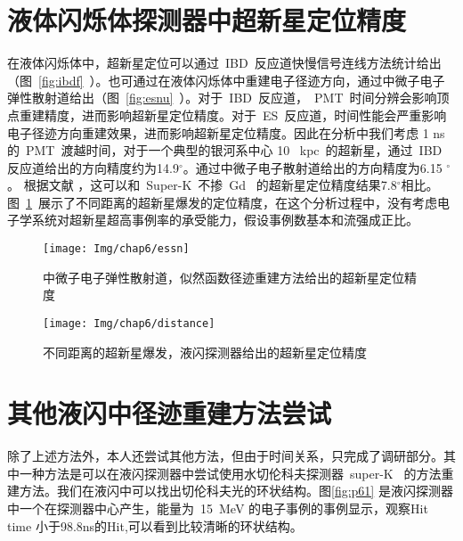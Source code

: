 \section{液体闪烁体探测器中超新星定位精度}
在液体闪烁体中，超新星定位可以通过~IBD~反应道快慢信号连线方法统计给出（图~\ref{fig:ibdf}~）。也可通过在液体闪烁体中重建电子径迹方向，通过中微子电子弹性散射道给出（图~\ref{fig:esnu}~）。对于~IBD~反应道，~PMT~时间分辨会影响顶点重建精度，进而影响超新星定位精度。对于~ES~反应道，时间性能会严重影响电子径迹方向重建效果，进而影响超新星定位精度。因此在分析中我们考虑 1 ns的~PMT~渡越时间，对于一个典型的银河系中心 10 ~kpc~的超新星，通过~IBD~ 反应道给出的方向精度约为14.9$^{\circ}$。通过中微子电子散射道给出的方向精度为6.15 $^{\circ}$。 根据文献 \citep{tomas2003supernova}，这可以和~Super-K~不掺~Gd~ 的超新星定位精度结果7.8$^{\circ}$相比。图~\ref{fig:distance}~展示了不同距离的超新星爆发的定位精度，在这个分析过程中，没有考虑电子学系统对超新星超高事例率的承受能力，假设事例数基本和流强成正比。
\begin{figure}[!htbp]
\begin{minipage}[t]{0.48\linewidth}
  \centering
   \texttt{[image: Img/chap6/essn]}
    \caption{ 中微子电子弹性散射道，似然函数径迹重建方法给出的超新星定位精度}
  \label{fig:esnu}
  \end{minipage}
  \quad\quad
  \begin{minipage}[t]{0.48\linewidth}
  \centering
   \texttt{[image: Img/chap6/distance]}
    \caption{不同距离的超新星爆发，液闪探测器给出的超新星定位精度}
  \label{fig:distance}
    \end{minipage}
\end{figure}
\section{其他液闪中径迹重建方法尝试}
除了上述方法外，本人还尝试其他方法，但由于时间关系，只完成了调研部分。其中一种方法是可以在液闪探测器中尝试使用水切伦科夫探测器~super-K~ 的方法重建方法。我们在液闪中可以找出切伦科夫光的环状结构。图\ref{fig:p61} 是液闪探测器中一个在探测器中心产生，能量为~15~MeV 的电子事例的事例显示，观察Hit time 小于98.8ns的Hit,可以看到比较清晰的环状结构。%

